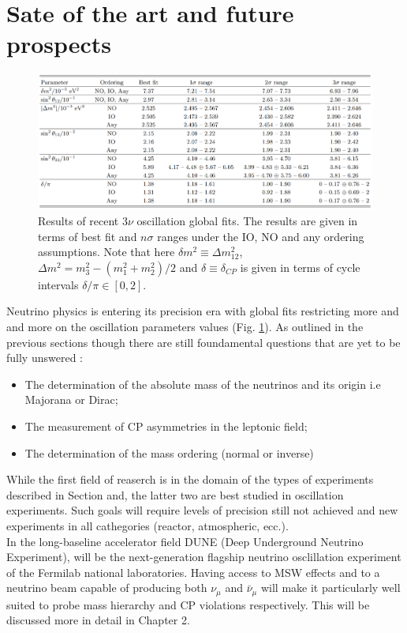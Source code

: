 \documentclass[12pt,a4paper,openright,twoside]{report}
\begin{document}
\section{Sate of the art and future prospects}
\begin{figure}
	\centering
	\includegraphics[width=1\textwidth]{stateoftheart.png}
	\caption{\label{stateof the art:fig} Results of recent $3\nu$ oscillation global fits. The results are given in terms of best fit and $n\sigma$ ranges under the IO, NO and any ordering assumptions. Note that here $\delta m^2 \equiv \Delta m_{12}^2$, $\Delta m^2 = m_3^2-(m_1^2+m_2^2)/2$ and $\delta \equiv \delta_{CP}$ is given in terms of cycle intervals $\delta/\pi \in [0,2]$.} 
\end{figure}
Neutrino physics is entering its precision era with global fits restricting more and and more on the oscillation parameters values (Fig. \ref{stateof the art:fig}). As outlined in the previous sections though there are still foundamental questions that are yet to be fully unswered : 
\begin{itemize}
	\item The determination of the absolute mass of the neutrinos and its origin i.e Majorana or Dirac;
	\item The measurement of CP asymmetries in the leptonic field;
	\item The determination of the mass ordering (normal or inverse)
\end{itemize}
While the first field of reaserch is in the domain of the types of experiments described in Section and, the latter two are best studied in oscillation experiments. Such goals will require levels of precision still not achieved and new experiments in all cathegories (reactor, atmospheric, ecc.). \\
In the long-baseline accelerator field DUNE (Deep Underground Neutrino Experiment), will be the next-generation flagship neutrino osclillation experiment of the Fermilab national laboratories. Having access to MSW effects and to a neutrino beam capable of producing both $\nu_\mu$ and $\bar{\nu}_\mu$ will make it particularly well suited to probe mass hierarchy and CP violations respectively. This will be discussed more in detail in Chapter 2.
\end{document}
